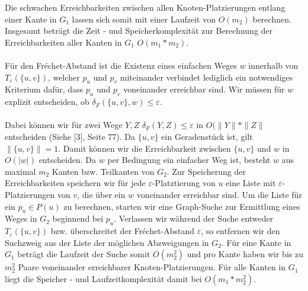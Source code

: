 \documentclass[a4paper, 12pt, twoside]{article}
\theoremstyle{Format1} %
\begin{document}
Die schwachen Erreichbarkeiten zwischen allen Knoten-Platzierungen entlang einer Kante in $G_1$ lassen sich somit mit einer Laufzeit von $O(m_2)$ berechnen.
Insgesamt beträgt die Zeit - und Speicherkomplexität zur Berechnung der Erreichbarkeiten aller Kanten in $G_1$ $O(m_1*m_2)$.
\\
\\
Für den Fréchet-Abstand ist die Existenz eines einfachen Weges $w$ innerhalb von $T_{\varepsilon}(\{u,v\})$, welcher $p_u$ und $p_v$ miteinander verbindet
lediglich ein notwendiges Kriterium dafür, dass $p_u$ und $p_v$ voneinander erreichbar sind. Wir müssen für $w$ explizit entscheiden,
ob $\delta_F(\{u,v\}, w) \leq \varepsilon$.
\\
\\
Dabei können wir für zwei Wege $Y,Z$  $\delta_F(Y,Z) \leq \varepsilon$ in $O(\|Y\|*\|Z\|$ entscheiden (Siehe [3], Seite 77).
Da $\{u,v\}$ ein Geradenstück ist, gilt $\|\{u,v\}\| = 1$. Damit können wir die Erreichbarkeit zwischen $\{u,v\}$ und $w$ in $O(|w|)$ entscheiden.
Da $w$ per Bedingung ein einfacher Weg ist, besteht $w$ aus maximal $m_2$ Kanten bzw. Teilkanten von $G_2$.
Zur Speicherung der Erreichbarkeiten speichern wir für jede $\varepsilon$-Platztierung von $u$ eine Liste mit $\varepsilon$-Platzierungen von $v$, die
über ein $w$ voneinander erreichbar sind. Um die Liste für ein $p_u \in P(u)$ zu berechnen, starten wir eine Graph-Suche zur Ermittlung eines
Weges in $G_2$ beginnend bei $p_u$. Verlassen wir während der Suche entweder $T_{\varepsilon}(\{u,v\})$ bzw. überschreitet der Fréchet-Abstand $\varepsilon$,
so entfernen wir den Suchzweig aus der Liste der möglichen Abzweigungen in $G_2$.
Für eine Kante in $G_1$ beträgt die Laufzeit der Suche somit $O(m_2^2)$ und pro Kante haben wir bis zu $m_2^2$ Paare voneinander erreichbarer Knoten-Platzierungen.
Für alle Kanten in $G_1$ liegt die Speicher - und Laufzeitkomplexität damit bei $O(m_1*m_2^2)$.
\\
\\
\end{document}
